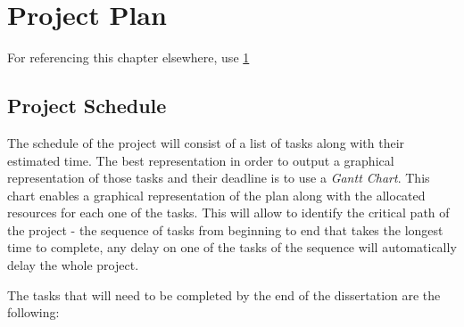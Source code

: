 \chapter{Project Plan}

\label{Chapter5} For referencing this chapter elsewhere, use \ref{Chapter5}



\section{Project Schedule}

The schedule of the project will consist of a list of tasks along with their estimated time. The best representation in order to output a graphical representation of those tasks and their deadline is to use a \emph{Gantt Chart}. This chart enables a graphical representation of the plan along with the allocated resources for each one of the tasks. This will allow to identify the critical path of the project - the sequence of tasks from beginning to end that takes the longest time to complete, any delay on one of the tasks of the sequence will automatically delay the whole project.

The tasks that will need to be completed by the end of the dissertation are the following:


